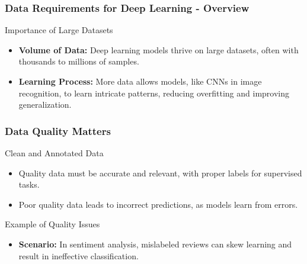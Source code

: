 \documentclass[aspectratio=169]{beamer}
\begin{document}
\begin{frame}[fragile]
    \frametitle{Data Requirements for Deep Learning - Overview}
    \begin{block}{Importance of Large Datasets}
        \begin{itemize}
            \item \textbf{Volume of Data:} Deep learning models thrive on large datasets, often with thousands to millions of samples.
            \item \textbf{Learning Process:} More data allows models, like CNNs in image recognition, to learn intricate patterns, reducing overfitting and improving generalization.
        \end{itemize}
    \end{block}
\end{frame}

\begin{frame}[fragile]
    \frametitle{Data Quality Matters}
    \begin{block}{Clean and Annotated Data}
        \begin{itemize}
            \item Quality data must be accurate and relevant, with proper labels for supervised tasks.
            \item Poor quality data leads to incorrect predictions, as models learn from errors.
        \end{itemize}
    \end{block}
    
    \begin{block}{Example of Quality Issues}
        \begin{itemize}
            \item \textbf{Scenario:} In sentiment analysis, mislabeled reviews can skew learning and result in ineffective classification.
        \end{itemize}
    \end{block}
\end{frame}
\end{document}
